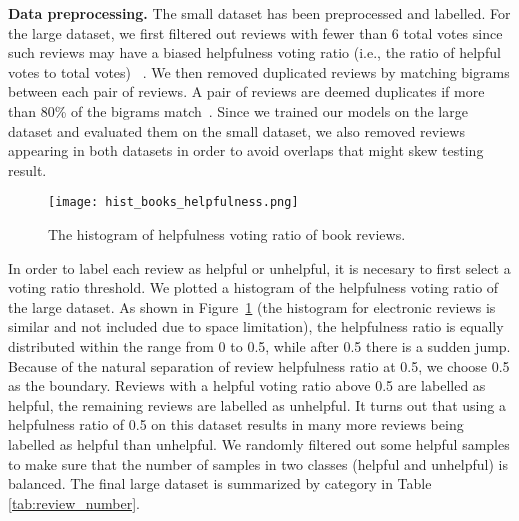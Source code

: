 \documentclass[conference,compsoc]{IEEEtran}
\begin{document}
\textbf{Data preprocessing.} The small dataset has been preprocessed and labelled. For the large dataset, we first filtered out reviews with fewer than 6 total votes since such reviews may have a biased helpfulness voting ratio (i.e., the ratio of helpful votes to total votes) ~\cite{Kim_2006}. We then removed  duplicated reviews by matching bigrams between each pair of reviews. A pair of reviews are deemed duplicates if more than 80\% of the bigrams match~\cite{Kim_2006, Hong_2012}. Since we trained our models on the large dataset and evaluated them on the small dataset, we also removed reviews appearing in both datasets in order to avoid overlaps that might skew testing result.

\begin{figure}[t]
	\graphicspath{ {./figures/} }
	\centering
	\texttt{[image: hist\_books\_helpfulness.png]}
	\caption{The histogram of helpfulness voting ratio of book reviews.}
	\label{fig:hist_help_ratio}
\end{figure}%

In order to label each review as helpful or unhelpful, it is necesary to first  select a voting ratio threshold. We plotted a histogram of the helpfulness voting ratio of the large dataset. As shown in Figure~\ref{fig:hist_help_ratio} (the histogram for electronic reviews is similar and not included due to space limitation), the helpfulness ratio is equally distributed within the range from 0 to 0.5, while after 0.5 there is a sudden jump. Because of the natural separation of review helpfulness ratio at 0.5, we choose 0.5 as the boundary. Reviews with a helpful voting ratio above 0.5 are labelled as helpful, the remaining reviews are labelled as unhelpful.
It turns out that using a helpfulness ratio of 0.5 on this dataset results in many more reviews being labelled as helpful than unhelpful.
We randomly filtered out some helpful samples to make sure that the number of samples in two classes (helpful and unhelpful) is balanced. The final large dataset is summarized by category in Table \ref{tab:review_number}.
\end{document}
